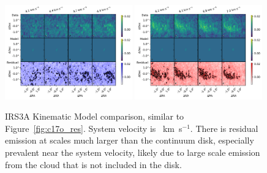 \begin{figure}[H]
\begin{center}
\includegraphics[width=0.49\textwidth]{img/Channelplot_h13cnplotblue_H13CN.pdf}
\includegraphics[width=0.49\textwidth]{img/Channelplot_h13cnplotred_H13CN.pdf}
\end{center}
\caption{IRS3A Kinematic Model comparison, similar to Figure~\ref{fig:c17o_res}. System velocity is ~km~s$^{-1}$. There is residual emission at scales much larger than the continuum disk, especially prevalent near the system velocity, likely due to large scale emission from the cloud that is not included in the disk.}\label{fig:h13cn_res}
\end{figure}




